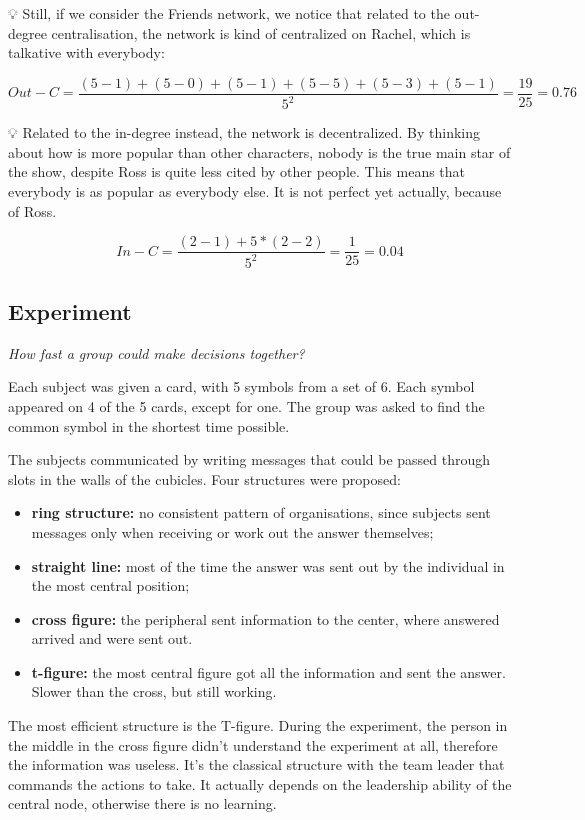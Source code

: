 \documentclass[
  notitlepage,
  onecolumn,
  openany]{book}
\providecommand{\tightlist}{%
  \setlength{\itemsep}{0pt}\setlength{\parskip}{0pt}}
\begin{document}
💡 Still, if we consider the Friends network, we notice that related to the out-degree centralisation, the network is kind of centralized on Rachel, which is talkative with everybody:

\[
Out-C = \frac{(5-1)+(5-0)+(5-1)+(5-5)+(5-3)+(5-1)}{5^2} = \frac{19}{25} = 0.76
\]

💡 Related to the in-degree instead, the network is decentralized. By thinking about how is more popular than other characters, nobody is the true main star of the show, despite Ross is quite less cited by other people. This means that everybody is as popular as everybody else. It is not perfect yet actually, because of Ross.

\[
In-C = \frac{(2-1)+5*(2-2)}{5^2} = \frac{1}{25} = 0.04
\]

\hypertarget{experiment}{%
\subsection{Experiment}\label{experiment}}

\emph{How fast a group could make decisions together?}

Each subject was given a card, with 5 symbols from a set of 6. Each symbol appeared on 4 of the 5 cards, except for one. The group was asked to find the common symbol in the shortest time possible.

The subjects communicated by writing messages that could be passed through slots in the walls of the cubicles. Four structures were proposed:

\begin{itemize}
\tightlist
\item
  \textbf{ring structure:} no consistent pattern of organisations, since subjects sent messages only when receiving or work out the answer themselves;
\item
  \textbf{straight line:} most of the time the answer was sent out by the individual in the most central position;
\item
  \textbf{cross figure:} the peripheral sent information to the center, where answered arrived and were sent out.
\item
  \textbf{t-figure:} the most central figure got all the information and sent the answer. Slower than the cross, but still working.
\end{itemize}

The most efficient structure is the T-figure. During the experiment, the person in the middle in the cross figure didn't understand the experiment at all, therefore the information was useless. It's the classical structure with the team leader that commands the actions to take. It actually depends on the leadership ability of the central node, otherwise there is no learning.
\end{document}

